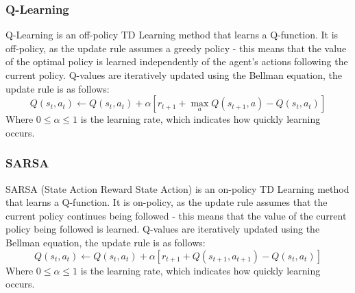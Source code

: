 \subsubsection{Q-Learning}
Q-Learning \cite{Watkins:1989, journals/ml/WatkinsD92} is an off-policy TD Learning method that learns a Q-function. It is off-policy, as the update rule assumes a greedy policy - this means that the value of the optimal policy is learned independently of the agent's actions following the current policy. Q-values are iteratively updated using the Bellman equation, the update rule is as follows:
$$Q(s_t,a_t) \leftarrow Q(s_t,a_t) + \alpha[r_{t+1} + \max_aQ(s_{t+1}, a) -Q(s_t,a_t)]$$
Where $0 \le \alpha \le 1$ is the learning rate, which indicates how quickly learning occurs.
\subsubsection{SARSA}
SARSA (State Action Reward State Action) \cite{rummery:cuedtr94} is an on-policy TD Learning method that learns a Q-function. It is on-policy, as the update rule assumes that the current policy continues being followed - this means that the value of the current policy being followed is learned. Q-values are iteratively updated using the Bellman equation, the update rule is as follows:
$$Q(s_t, a_t) \leftarrow Q(s_t, a_t) + \alpha[r_{t+1} + Q(s_{t+1}, a_{t+1})-Q(s_t, a_t)]$$
Where $0 \le \alpha \le 1$ is the learning rate, which indicates how quickly learning occurs.
